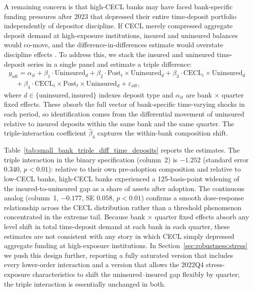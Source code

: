 A remaining concern is that high-CECL banks may have faced bank-specific funding
pressures after 2023 that depressed their entire time-deposit portfolio
independently of depositor discipline.  If CECL merely compressed aggregate
deposit demand at high-exposure institutions, insured and uninsured balances
would co-move, and the difference-in-differences estimate would overstate
discipline effects \citep{covitz2004market}.  To address this, we stack the
insured and uninsured time-deposit series in a single panel and estimate a
triple difference:
\begin{equation*}
\begin{split}
  y_{idt}
  = \alpha_{it}
  + \beta_1 \cdot \mathrm{Uninsured}_d
  + \beta_2 \cdot \mathrm{Post}_{t} \times \mathrm{Uninsured}_d
  + \beta_3 \cdot \mathrm{CECL}_i \times \mathrm{Uninsured}_d \\
  \quad + \beta_4 \cdot \mathrm{CECL}_i \times \mathrm{Post}_{t} \times \mathrm{Uninsured}_d
  + \varepsilon_{idt},
\end{split}
\end{equation*}
where $d \in \{\text{uninsured}, \text{insured}\}$ indexes deposit type and
$\alpha_{it}$ are bank $\times$ quarter fixed effects.  These absorb the full
vector of bank-specific time-varying shocks in each period, so identification
comes from the differential movement of uninsured relative to insured deposits
within the same bank and the same quarter.  The triple-interaction coefficient
$\hat{\beta}_4$ captures the within-bank composition shift.

Table~\ref{tab:small_bank_triple_diff_time_deposits} reports the estimates.  The
triple interaction in the binary specification (column~2) is $-1.252$ (standard
error $0.340$, $p < 0.01$): relative to their own pre-adoption composition and
relative to low-CECL banks, high-CECL banks experienced a 125-basis-point
widening of the insured-to-uninsured gap as a share of assets after adoption.
The continuous analog (column~1, $-0.177$, SE $0.058$, $p < 0.01$) confirms a
smooth dose-response relationship across the CECL distribution rather than a
threshold phenomenon concentrated in the extreme tail.  Because bank $\times$
quarter fixed effects absorb any level shift in total time-deposit demand at each
bank in each quarter, these estimates are not consistent with any story in which
CECL simply depressed aggregate funding at high-exposure institutions.  In
Section~\ref{sec:robustness:stress} we push this design further, reporting a
fully saturated version that includes every lower-order interaction and a
version that allows the 2022Q4 stress-exposure characteristics to shift the
uninsured--insured gap flexibly by quarter; the triple interaction is
essentially unchanged in both.


